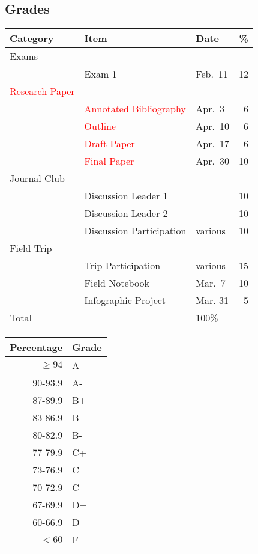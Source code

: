 \documentclass{tufte-handout}
\begin{document}
\subsection{Grades}

\begin{tabular}{l l l r}
Category & Item &  Date &  \%  \\
\hline
Exams \\
& Exam 1 & Feb.\ 11 & 12 \\							
\textcolor{red}{Research Paper} \\ 
& \textcolor{red}{Annotated Bibliography} & Apr.\ 3 & 6 \\
& \textcolor{red}{Outline} & Apr.\ 10 & 6 \\
& \textcolor{red}{Draft Paper} & Apr.\ 17 & 6 \\
& \textcolor{red}{Final Paper} & Apr.\  30 & 10 \\ 
Journal Club \\			
& Discussion Leader 1 &   & 10 \\
& Discussion Leader 2 &   & 10 \\ 
& Discussion Participation & various & 10 \\		
Field Trip \\	
& Trip Participation & various & 15 \\
& Field Notebook & Mar.\ 7 & 10 \\				
& Infographic Project & Mar. 31 & 5 \\
\hline
Total & &   100\%
\end{tabular}


\begin{margintable}
\begin{tabular}{rl}
Percentage & Grade \\
\hline 
$\ge94$ & A \\
90-93.9 & A- \\
87-89.9 & B+ \\
83-86.9 & B \\
80-82.9 & B- \\
77-79.9 & C+ \\
73-76.9 & C \\
70-72.9 & C- \\
67-69.9 & D+ \\
60-66.9 & D \\
$<60$ & F \\
\hline
\end{tabular}
\end{margintable}
\end{document}
